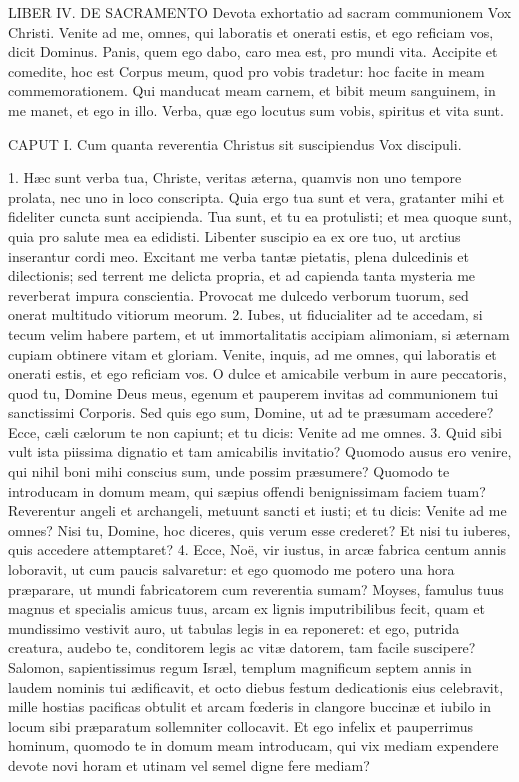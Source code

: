 \documentclass[twoside]{article}
\begin{document}
LIBER IV.
DE SACRAMENTO
Devota exhortatio ad sacram communionem
Vox Christi.
Venite ad me, omnes, qui laboratis et onerati estis, et ego reficiam vos, dicit Dominus. Panis, quem ego dabo, caro mea est, pro mundi vita. Accipite et comedite, hoc est Corpus meum, quod pro vobis tradetur: hoc facite in meam commemorationem. Qui manducat meam carnem, et bibit meum sanguinem, in me manet, et ego in illo. Verba, quæ ego locutus sum vobis, spiritus et vita sunt.


CAPUT I.
Cum quanta reverentia Christus sit suscipiendus
Vox discipuli.

1. Hæc sunt verba tua, Christe, veritas æterna, quamvis non uno tempore prolata, nec uno in loco conscripta. Quia ergo tua sunt et vera, gratanter mihi et fideliter cuncta sunt accipienda. Tua sunt, et tu ea protulisti; et mea quoque sunt, quia pro salute mea ea edidisti. Libenter suscipio ea ex ore tuo, ut arctius inserantur cordi meo. Excitant me verba tantæ pietatis, plena dulcedinis et dilectionis; sed terrent me delicta propria, et ad capienda tanta mysteria me reverberat impura conscientia. Provocat me dulcedo verborum tuorum, sed onerat multitudo vitiorum meorum.
2. Iubes, ut fiducialiter ad te accedam, si tecum velim habere partem, et ut immortalitatis accipiam alimoniam, si æternam cupiam obtinere vitam et gloriam. Venite, inquis, ad me omnes, qui laboratis et onerati estis, et ego reficiam vos. O dulce et amicabile verbum in aure peccatoris, quod tu, Domine Deus meus, egenum et pauperem invitas ad communionem tui sanctissimi Corporis. Sed quis ego sum, Domine, ut ad te præsumam accedere? Ecce, cæli cælorum te non capiunt; et tu dicis: Venite ad me omnes.
3. Quid sibi vult ista piissima dignatio et tam amicabilis invitatio? Quomodo ausus ero venire, qui nihil boni mihi conscius sum, unde possim præsumere? Quomodo te introducam in domum meam, qui sæpius offendi benignissimam faciem tuam? Reverentur angeli et archangeli, metuunt sancti et iusti; et tu dicis: Venite ad me omnes? Nisi tu, Domine, hoc diceres, quis verum esse crederet? Et nisi tu iuberes, quis accedere attemptaret?
4. Ecce, Noë, vir iustus, in arcæ fabrica centum annis loboravit, ut cum paucis salvaretur: et ego quomodo me potero una hora præparare, ut mundi fabricatorem cum reverentia sumam? Moyses, famulus tuus magnus et specialis amicus tuus, arcam ex lignis imputribilibus fecit, quam et mundissimo vestivit auro, ut tabulas legis in ea reponeret: et ego, putrida creatura, audebo te, conditorem legis ac vitæ datorem, tam facile suscipere? Salomon, sapientissimus regum Isræl, templum magnificum septem annis in laudem nominis tui ædificavit, et octo diebus festum dedicationis eius celebravit, mille hostias pacificas obtulit et arcam fœderis in clangore buccinæ et iubilo in locum sibi præparatum sollemniter collocavit. Et ego infelix et pauperrimus hominum, quomodo te in domum meam introducam, qui vix mediam expendere devote novi horam et utinam vel semel digne fere mediam?
\end{document}
